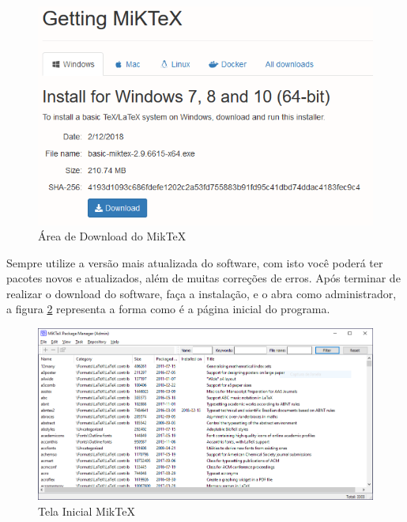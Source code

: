\begin{figure}[htb]
	\caption{Área de Download do MikTeX \label{fig_Cap1_downloadMikTex}}
	\begin{center}
		\includegraphics[scale=0.4]{./Imagens/capitulo_1/downloadMikTeX.png}
	\end{center}
\end{figure}

Sempre utilize a versão mais atualizada do software, com isto você poderá ter pacotes novos e atualizados, além de muitas correções de erros. Após terminar de realizar o download do software, faça a instalação, e o abra como administrador, a figura \ref{fig_Cap1_MikTeX} representa a forma como é a página inicial do programa.

\begin{figure}[htb]
	\caption{Tela Inicial MikTeX \label{fig_Cap1_MikTeX}}
	\begin{center}
		\includegraphics[scale=0.4]{./Imagens/capitulo_1/MikTeX.png}
	\end{center}
\end{figure}

